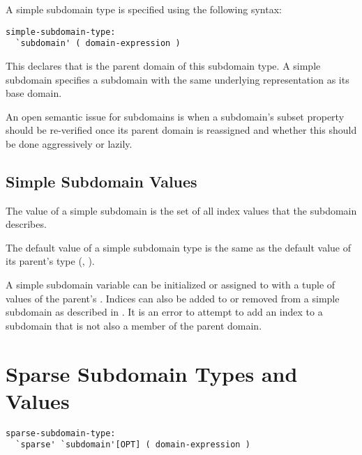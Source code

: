 A simple subdomain type is specified using the following syntax:
\begin{syntax}
\begin{verbatim}
simple-subdomain-type:
  `subdomain' ( domain-expression )
\end{verbatim}
\end{syntax}

This declares that  is the parent domain of
this subdomain type.  A simple subdomain specifies a subdomain
with the same underlying representation as its base domain.  

\begin{openissue}

An open semantic issue for subdomains is when a subdomain's subset
property should be re-verified once its parent domain is reassigned
and whether this should be done aggressively or lazily.

\end{openissue}

\subsection{Simple Subdomain Values}

The value of a simple subdomain is the set of all index values
that the subdomain describes.


The default value of a simple subdomain type is the same as the default value
of its parent's type
(, ).

A simple subdomain variable can be initialized or assigned to
with a tuple of values of the parent's .
Indices can also be added to or removed from a simple subdomain
as described in .
It is an error to attempt to add an index to a subdomain that is not also
a member of the parent domain.


\section{Sparse Subdomain Types and Values}
\label{Sparse_Subdomain_Types_and_Values}

\begin{syntax}
\begin{verbatim}
sparse-subdomain-type:
  `sparse' `subdomain'[OPT] ( domain-expression )
\end{verbatim}
\end{syntax}

